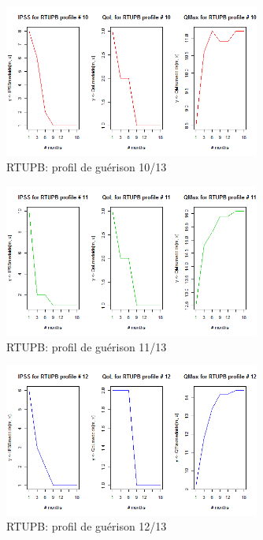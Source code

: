 \begin{figure}[H]
\centering
\includegraphics[width=0.75\textwidth]{../Fig/RTUPB/rtupb-profil-post-10.png}
\caption{RTUPB: profil de guérison 10/13}
\end{figure}


\begin{figure}[H]
\centering
\includegraphics[width=0.75\textwidth]{../Fig/RTUPB/rtupb-profil-post-11.png}
\caption{RTUPB: profil de guérison 11/13}
\end{figure}

\begin{figure}[H]
\centering
\includegraphics[width=0.75\textwidth]{../Fig/RTUPB/rtupb-profil-post-12.png}
\caption{RTUPB: profil de guérison 12/13}
\end{figure}

